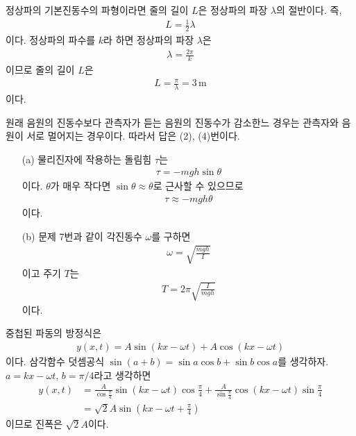 \documentclass[floatfix,nofootinbib,superscriptaddress,fleqn]{revtex4-2}
\begin{document}
\vspace{0.5cm} 

\vspace{0.5cm}
 

\vspace{0.5cm} 
정상파의 기본진동수의 파형이라면 줄의 길이 $L$은 정상파의 파장 $\lambda$의 절반이다. 즉,
\begin{align}
  L = \frac{1}{2}\lambda
\end{align}
이다. 정상파의 파수를 $k$라 하면 정상파의 파장 $\lambda$은
\begin{align}
  \lambda = \frac{2\pi}{k}
\end{align}
이므로 줄의 길이 $L$은
\begin{align}
  L = \frac{\pi}{\lambda} = 3\,\mathrm{m}
\end{align}
이다.
\vspace{0.5cm}
 

\vspace{0.5cm} 
원래 음원의 진동수보다 관측자가 듣는 음원의 진동수가 감소한느 경우는 관측자와 음원이 서로 멀어지는
경우이다. 따라서 답은 (2), (4)번이다.
\vspace{0.5cm}
 

\vspace{0.5cm} 
\begin{itemize}
  \item[(a)]
  물리진자에 작용하는 돌림힘 $\tau$는
  \begin{align}
    \tau = -mgh\sin\theta
  \end{align}
  이다. $\theta$가 매우 작다면 $\sin\theta\approx\theta$로 근사할 수 있으므로
  \begin{align}
    \tau \approx -mgh\theta
  \end{align}
  이다.
  \item[(b)] 
  문제 7번과 같이 각진동수 $\omega$를 구하면
  \begin{align}
    \omega = \sqrt{\frac{mgh}{I}}
  \end{align}
  이고 주기 $T$는
  \begin{align}
    T = 2\pi\sqrt{\frac{I}{mgh}}
  \end{align}
  이다.
\end{itemize}
\vspace{0.5cm}
 

\vspace{0.5cm} 
중첩된 파동의 방정식은
\begin{align}
  y(x,t) = A\sin(kx-\omega t)+A\cos(kx-\omega t)
\end{align}
이다. 삼각함수 덧셈공식 $\sin(a+b) = \sin a\cos b+\sin b\cos a$를 생각하자.
$a = kx-\omega t$, $b= \pi/4$라고 생각하면
\begin{align}
  y(x,t) &= \frac{A}{\cos\frac{\pi}{4}}\sin(kx-\omega t)\cos\frac{\pi}{4}
  +\frac{A}{\sin\frac{\pi}{4}}\cos(kx-\omega t)\sin\frac{\pi}{4}  \\
  &=\sqrt{2}A\sin(kx-\omega t+\frac{\pi}{4})
\end{align}
이므로 진폭은 $\sqrt{2}A$이다.
\vspace{0.5cm}
 
\end{document}

